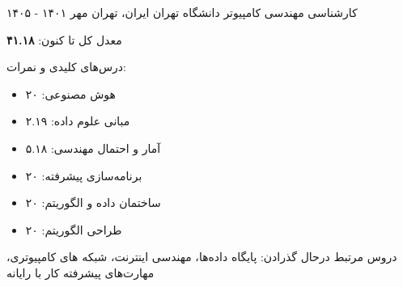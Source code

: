 

\begin{cventries}

  \cventry
    {کارشناسی مهندسی کامپیوتر} %
    {دانشگاه تهران} %
    {ایران، تهران} %
    {مهر ۱۴۰۱ - ۱۴۰۵} %
    {
      \begin{cvitems} %
        \item {معدل کل تا کنون: \textbf{۴۱.۱۸}}
        \item {درس‌های کلیدی و نمرات:}
        \begin{itemize}
          \item هوش مصنوعی: ۲۰
          \item مبانی علوم داده: ۲.۱۹
          \item آمار و احتمال مهندسی: ۵.۱۸
          \item برنامه‌سازی پیشرفته: ۲۰
          \item ساختمان داده و الگوریتم: ۲۰
          \item طراحی الگوریتم: ۲۰
        \end{itemize}
        \item {دروس مرتبط درحال گذرادن: پایگاه داده‌ها، مهندسی اینترنت، شبکه های کامپیوتری، مهارت‌های پیشرفته کار با رایانه}
      \end{cvitems}
    }
\end{cventries}
